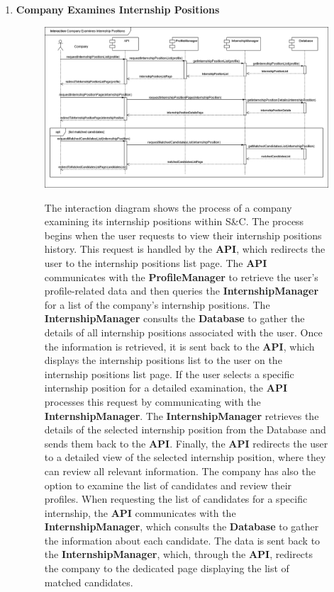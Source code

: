 \begin{enumerate}
    \newpage
    \item \textbf{Company Examines Internship Positions}
    \begin{figure}[h!]
            \centering  \includegraphics[width=1\textwidth]{DD/Images/Interactions/INT11_CompanyExaminesInternshipPosition.drawio.png}
            \label{fig:ComponentViewDiagram}
            \caption*{The interaction diagram shows the process of a company examining its internship positions within S\&C. The process begins when the user requests to view their internship positions history. This request is handled by the \textbf{API}, which redirects the user to the internship positions list page. The \textbf{API} communicates with the \textbf{ProfileManager} to retrieve the user’s profile-related data and then queries the \textbf{InternshipManager} for a list of the company’s internship positions.
            The \textbf{InternshipManager} consults the \textbf{Database} to gather the details of all internship positions associated with the user. 
            Once the information is retrieved, it is sent back to the \textbf{API}, which displays the internship positions list to the user on the internship positions list page.
            If the user selects a specific internship position for a detailed examination, the \textbf{API} processes this request by communicating with the \textbf{InternshipManager}. The \textbf{InternshipManager} retrieves the details of the selected internship position from the Database and sends them back to the \textbf{API}. Finally, the \textbf{API} redirects the user to a detailed view of the selected internship position, where they can review all relevant information.
            The company has also the option to examine the list of candidates and review their profiles. When requesting the list of candidates for a specific internship, the \textbf{API} communicates with the \textbf{InternshipManager}, which consults the \textbf{Database} to gather the information about each candidate. The data is sent back to the \textbf{InternshipManager}, which, through the \textbf{API}, redirects the company to the dedicated page displaying the list of matched candidates.
            }
    \end{figure}


\end{enumerate}
